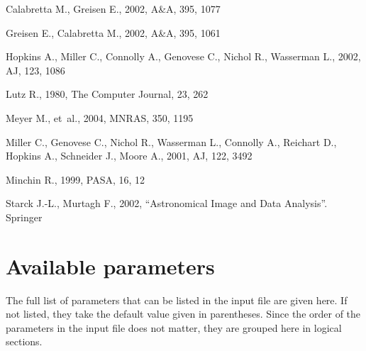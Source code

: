 \documentclass[12pt]{article}
\begin{document}
%
%
%
\begin{thebibliography}{}

{Calabretta} M.,  {Greisen} E.,  2002, A\&A, 395, 1077

{Greisen} E.,  {Calabretta} M.,  2002, A\&A, 395, 1061

{Hopkins} A.,  {Miller} C.,  {Connolly} A.,  {Genovese} C.,  {Nichol} R.,
  {Wasserman} L.,  2002, AJ, 123, 1086

Lutz R.,  1980, The Computer Journal, 23, 262

{Meyer} M.,  et~al., 2004, MNRAS, 350, 1195

{Miller} C.,  {Genovese} C.,  {Nichol} R.,  {Wasserman} L.,  {Connolly} A.,
  {Reichart} D.,  {Hopkins} A.,  {Schneider} J.,    {Moore} A.,  2001, AJ, 122,
  3492

Minchin R.,  1999, PASA, 16, 12

Starck J.-L.,  Murtagh F.,  2002, {``Astronomical Image and Data Analysis''}.
Springer

\end{thebibliography}


\appendix
\newpage
\section{Available parameters}
\label{app-param}

The full list of parameters that can be listed in the input file are
given here. If not listed, they take the default value given in
parentheses. Since the order of the parameters in the input file does
not matter, they are grouped here in logical sections.
\end{document}
